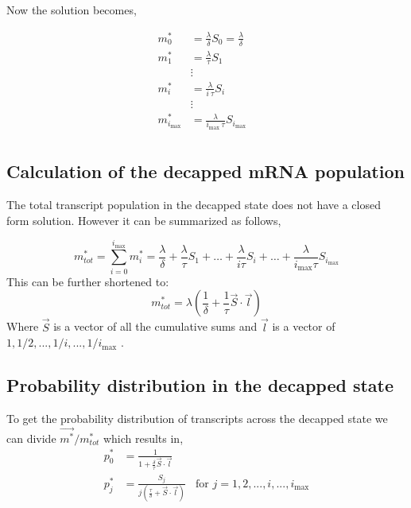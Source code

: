 \documentclass[review]{elsarticle}
\newcommand{\imax}{\ensuremath{{i_{\max}}}\xspace}
\begin{document}
Now the solution becomes,

\begin{align} \label{eq:decapped_solution} 
m_{0}^{*}  &= \frac{\lambda}{\delta}S_{0}=\frac{\lambda}{\delta} \\ \nonumber
m_{1}^{*}  &= \frac{\lambda}{\tau}S_{1} \\ \nonumber
& \vdots & \\ \nonumber
m_{i}^{*}  &= \frac{\lambda}{i \: \tau}S_{i}  \\ \nonumber
& \vdots & \\ \nonumber
m_{\imax}^{*}  &= \frac{\lambda}{\imax \: \tau}S_{\imax}  \\ \nonumber
\end{align}


\subsection{Calculation of the decapped mRNA population}

The total transcript population in the decapped state does not have a closed form solution. However it can be summarized as follows,

\begin{equation*}
	m_{tot}^{*} = \sum_{i=0}^{\imax} m_{i}^{*} = \frac{\lambda}{\delta} + \frac{\lambda}{\tau}S_{1} + \hdots + \frac{\lambda}{i \tau}S_{i} + \hdots  + \frac{\lambda}{\imax \tau}S_{\imax} 
\end{equation*}
This can be further shortened to:
\begin{equation} \label{eq: marked_total_pop}
	m_{tot}^{*} = \lambda(\frac{1}{\delta} + \frac{1}{\tau}\vec{S} \cdot \vec{l}	) 
\end{equation}
Where $\vec{S}$ is a vector of all the cumulative sums and $\vec{l}$ is a vector of $1,1/2,...,1/i,...,1/\imax$ . 

\subsection{Probability distribution in the decapped state}

To get the probability distribution of transcripts across the decapped state we can divide $\vec{m^{*}}/m_{tot}^{*}$ which results in,
\begin{align}\label{eq:decapped_distribution}
	p_{0}^{*} &= \frac{1}{1 + \frac{\delta}{\tau}\vec{S} \cdot \vec{l}}	\\
  	p_{j}^{*} &= \frac{S_{j}}{j(\frac{\tau}{\delta} + \vec{S} \cdot \vec{l})}	\:\:\:\: \text{for } j=1, 2, ..., i, ..., \imax
\end{align}
\end{document}
